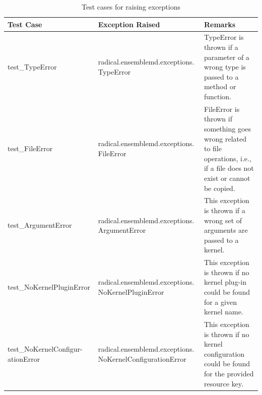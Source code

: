 \documentclass[10pt]{ruthesis}
\begin{document}
\begin{table}
\begin{center}
\def\arraystretch{2}
\begin{tabular}{|p{4cm}|p{5cm}|p{6cm}|}
\hline
\rule{0pt}{15pt} \textbf{Test Case} & \textbf{Exception Raised} & \textbf{Remarks} \\[2ex]
\hline
test\_TypeError &
radical.ensemblemd.exceptions.
TypeError &
TypeError is thrown if a parameter of a wrong type is passed to a method or function.
\\
\hline
test\_FileError &
radical.ensemblemd.exceptions.
FileError &
FileError is thrown if something goes wrong related to file operations, i.e., if a file does not exist or cannot be copied.
\\
\hline
test\_ArgumentError &
radical.ensemblemd.exceptions.
ArgumentError &
This exception is thrown if a wrong set of arguments are passed to a kernel.
\\
\hline
test\_NoKernelPluginError &
radical.ensemblemd.exceptions.
NoKernelPluginError &
This exception is thrown if no kernel plug-in could be found for a given kernel name.
\\
\hline
test\_NoKernelConfigur-
ationError &
radical.ensemblemd.exceptions.
NoKernelConfigurationError &
This exception is thrown if no kernel configuration could be found for the provided resource key.
\\
\hline
\end{tabular}
\end{center}
\caption{Test cases for raising exceptions}
\label{exception}
\end{table}
\end{document}
